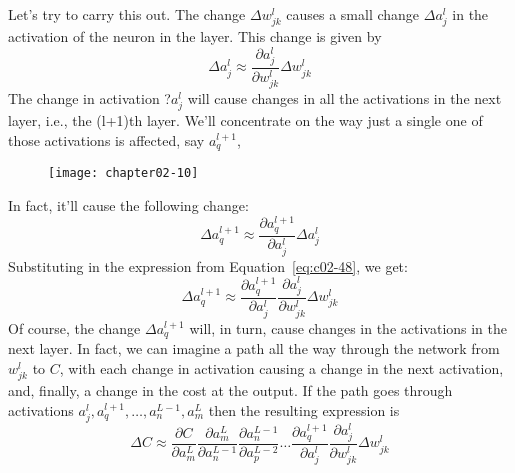 Let's try to carry this out. The change $\Delta w^l_{jk}$ causes a small change $\Delta a^l_j$ in the activation of the  neuron in the  layer. This change is given by 
\begin{equation}
\Delta a_{j}^{l} \approx \frac{\partial a_{j}^{l}}{\partial w_{j k}^{l}} \Delta w_{j k}^{l}
\label{eq:c02-48}
\end{equation}
The change in activation ?$a^l_j$ will cause changes in all the activations in the next layer, i.e., the (l+1)th layer. We'll concentrate on the way just a single one of those activations is affected, say $a^{l+1}_q$,


\begin{figure}
\texttt{[image: chapter02-10]}
\end{figure}

In fact, it'll cause the following change: 
\begin{equation}
\Delta a_{q}^{l+1} \approx \frac{\partial a_{q}^{l+1}}{\partial a_{j}^{l}} \Delta a_{j}^{l}
\label{eq:c02-49}
\end{equation}
Substituting in the expression from Equation~\ref{eq:c02-48}, we get: 
\begin{equation}
\Delta a_{q}^{l+1} \approx \frac{\partial a_{q}^{l+1}}{\partial a_{j}^{l}} \frac{\partial a_{j}^{l}}{\partial w_{j k}^{l}} \Delta w_{j k}^{l}
\label{eq:c02-50}
\end{equation}
Of course, the change $\Delta a^{l+1}_q$ will, in turn, cause changes in the activations in the next layer. In fact, we can imagine a path all the way through the network from $w^l_{jk}$ to $C$, with each change in activation causing a change in the next activation, and, finally, a change in the cost at the output. If the path goes through activations $a_{j}^{l}, a_{q}^{l+1}, \ldots, a_{n}^{L-1}, a_{m}^{L}$ then the resulting expression is 
\begin{equation}
\Delta C \approx \frac{\partial C}{\partial a_{m}^{L}} \frac{\partial a_{m}^{L}}{\partial a_{n}^{L-1}} \frac{\partial a_{n}^{L-1}}{\partial a_{p}^{L-2}} \ldots \frac{\partial a_{q}^{l+1}}{\partial a_{j}^{l}} \frac{\partial a_{j}^{l}}{\partial w_{j k}^{l}} \Delta w_{j k}^{l}
\label{eq:c02-51}
\end{equation}


